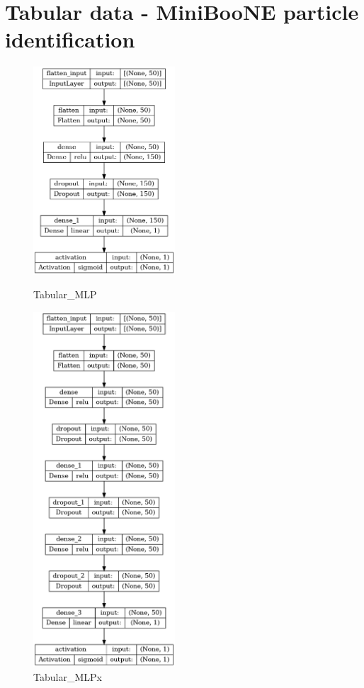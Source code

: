 \section{Tabular data - MiniBooNE particle identification}
\begin{figure}[hb!]
    \centering
    \begin{minipage}{0.5\textwidth}
        \centering
        \includegraphics[width=5.3cm]{obrazky-figures/model-plots/Tabular_MLP.png} %
        \caption{Tabular\_MLP}
    \end{minipage}\hfill
    \begin{minipage}{0.5\textwidth}
        \centering
        \includegraphics[width=5.3cm]{obrazky-figures/model-plots/Tabular_MLPx.png} %
        \caption{Tabular\_MLPx}
    \end{minipage}
\end{figure}

